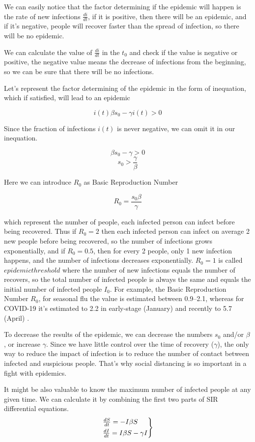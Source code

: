 \documentclass[nostrict]{szablonPG}
\begin{document}
We can easily notice that the factor determining if the epidemic will happen is the rate of new infections $\frac{di}{dt}$, if it is positive, then there will be an epidemic, and if it's negative, people will recover faster than the spread of infection, so there will be no epidemic.

We can calculate the value of $\frac{di}{dt}$ in the $t_0$ and check if the value is negative or positive, the negative value means the decrease of infections from the beginning, so we can be sure that there will be no infections.

Let's represent the factor determining of the epidemic in the form of inequation, which if satisfied, will lead to an epidemic

\[i(t) \beta s_0 - \gamma i(t) > 0\]

Since the fraction of infections $i(t)$ is never negative, we can omit it in our inequation.

\[\beta s_0 - \gamma > 0\]
\[ s_0 > \frac{\gamma}{\beta}\]

Here we can introduce $R_0$ as Basic Reproduction Number

\[ R_0 = \frac{s_0 \beta}{\gamma}\]

which represent the number of people, each infected person can infect before being recovered. Thus if $R_0 = 2$ then each infected person can infect on average 2 new people before being recovered, so the number of infections grows exponentially, and if $R_0 = 0.5$, then for every 2 people, only 1 new infection happens, and the number of infections decreases exponentially. $R_0 = 1$ is called $epidemic threshold$ where the number of new infections equals the number of recovers, so the total number of infected people is always the same and equals the initial number of infected people $I_0$. For example, the Basic Reproduction Number $R_0$, for seasonal flu the value is estimated between 0.9–2.1\cite{coburn2009modeling}, whereas for COVID-19 it's estimated to 2.2 in early-stage (January) \cite{li2020early} and recently to 5.7 (April) \cite{readeid}.

To decrease the results of the epidemic, we can decrease the numbers $s_0$ and/or $\beta$, or increase $\gamma$. Since we have little control over the time of recovery ($\gamma$), the only way to reduce the impact of infection is to reduce the number of contact between infected and suspicious people. That's why social distancing is so important in a fight with epidemics.


It might be also valuable to know the maximum number of infected people at any given time. We can calculate it by combining the first two parts of SIR differential equations.
\[
\begin{rcases}
\frac{dS}{dt} = - I \beta S \\
\frac{dI}{dt} = I \beta S - \gamma I
\end{rcases}
\]
\end{document}
